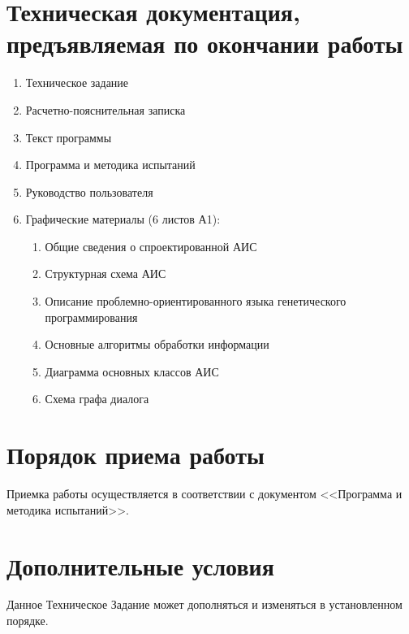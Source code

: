 \documentclass[russian,utf8,emptystyle]{eskdtext}
\begin{document}
\section{Техническая документация, предъявляемая по окончании работы}
\begin{enumerate}
\item Техническое задание
\item Расчетно-пояснительная записка
\item Текст программы
\item Программа и методика испытаний
\item Руководство пользователя
\item Графические материалы (6 листов А1):
\begin{enumerate}
\item Общие сведения о спроектированной АИС
\item Структурная схема АИС
\item Описание проблемно-ориентированного языка генетического программирования
\item Основные алгоритмы обработки информации
\item Диаграмма основных классов АИС
\item Схема графа диалога
\end{enumerate}
\end{enumerate}

\section{Порядок приема работы}
Приемка работы осуществляется в соответствии с документом <<Программа и методика испытаний>>.

\section{Дополнительные условия}
Данное Техническое Задание может дополняться и изменяться в установленном порядке.
\end{document}
